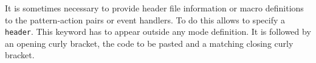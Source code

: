 It is sometimes necessary to provide header file information or macro
definitions to the pattern-action pairs or event handlers. To do this
{\quex} allows to specify a {\tt header}. This keyword has to appear
outside any mode definition. It is followed by an opening curly bracket,
the code to be pasted and a matching closing curly bracket.

